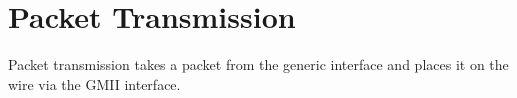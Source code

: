 \section{Packet Transmission}
Packet transmission takes a packet from the generic interface and places it on the wire via the GMII interface. 

